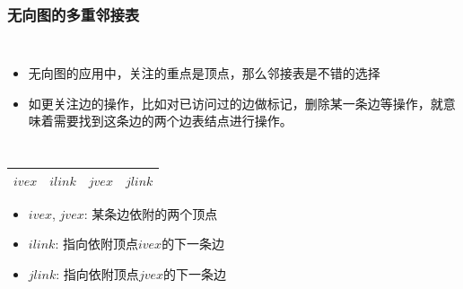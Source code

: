 \begin{frame}[fragile]
  \frametitle{无向图的多重邻接表}
  \begin{columns}[T]

    \small
    \begin{itemize}
    \item 无向图的应用中，关注的重点是顶点，那么邻接表是不错的选择
    \item 如更关注边的操作，比如对已访问过的边做标记，删除某一条边等操作，就意味着需要找到这条边的两个边表结点进行操作。
    \end{itemize}
  \end{columns}

  \begin{tabular}{|c|c|c|c}
    \hline
    $ivex$ & $ilink$ & $jvex$ & $jlink$ \\ \hline
  \end{tabular}
  
  \begin{itemize}
  \item $ivex$, $jvex$: 某条边依附的两个顶点
  \item $ilink$: 指向依附顶点$ivex$的下一条边
  \item $jlink$: 指向依附顶点$jvex$的下一条边
  \end{itemize}
\end{frame}

